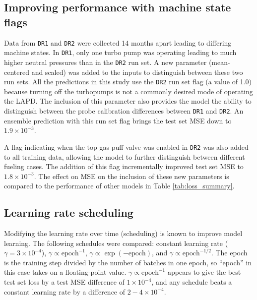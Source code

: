 \subsection{Improving performance with machine state flags}

Data from \texttt{DR1} and \texttt{DR2} were collected 14 months apart leading to differing machine states. In \texttt{DR1}, only one turbo pump was operating leading to much higher neutral pressures than in the \texttt{DR2} run set. A new parameter (mean-centered and scaled) was added to the inputs to distinguish between these two run sets. All the predictions in this study use the \texttt{DR2} run set flag (a value of 1.0) because turning off the turbopumps is not a commonly desired mode of operating the LAPD. The inclusion of this parameter also provides the model the ability to distinguish between the probe calibration differences between \texttt{DR1} and \texttt{DR2}. An ensemble prediction with this run set flag brings the test set MSE down to $1.9 \times 10^{-3}$.  

A flag indicating when the top gas puff valve was enabled in \texttt{DR2} was also added to all training data, allowing the model to further distinguish between different fueling cases. The addition of this flag incrementally improved test set MSE to $1.8 \times 10^{-3}$. The effect on MSE on the inclusion of these new parameters is compared to the performance of other models in Table \ref{tab:loss_summary}. 

\subsection{Learning rate scheduling}
Modifying the learning rate over time (scheduling) is known to improve model learning. The following schedules were compared: constant learning rate ($\gamma = 3 \times 10^{-4}$), $\gamma \propto \text{epoch}^{-1}$, $\gamma \propto \exp{(-\text{epoch})}$, and $\gamma \propto \text{epoch}^{-1/2}$. The epoch is the training step divided by the number of batches in one epoch, so ``epoch'' in this case takes on a floating-point value. $\gamma \propto \text{epoch}^{-1}$ appears to give the best test set loss by a test MSE difference of $1 \times 10^{-4}$, and any schedule beats a constant learning rate by a difference of $2-4 \times 10^{-4}$. 

